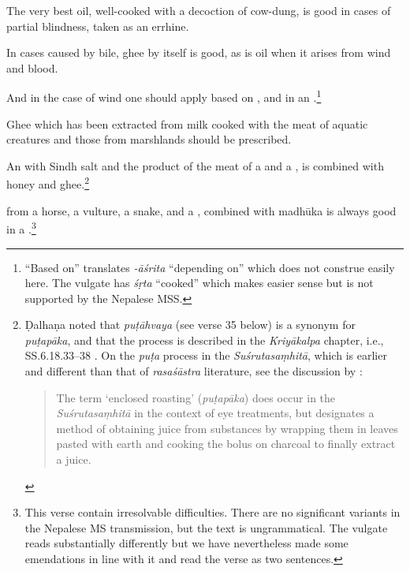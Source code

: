 \begin{translation}
    The very best oil, well-cooked with a decoction of cow-dung, is good in cases of 
    partial blindness, taken as an errhine.
    
    In cases caused by bile, ghee by itself is good, as is oil when it arises from wind and 
    blood.
    
    \item[31]
    And in the case of wind one should apply
     based on
    ,
    and 
    in an .\footnote{“Based on” translates \emph{-āśrita} 
    “depending on” which does not construe easily here.  The vulgate has \emph{śṛta} 
    “cooked” which makes easier sense but is not supported by the Nepalese MSS.}
    
    Ghee which has been extracted from milk cooked with the meat of aquatic 
    creatures and those from marshlands should be prescribed.
    
    \item[32]
    
    \dag An  with  Sindh salt and the product of the
    meat of a  and a , is combined with 
    honey
    and ghee.\footnote{Ḍalhaṇa noted \citep[628a]{vulgate} that \emph{puṭāhvaya} 
    (see
    verse 35 below) is a synonym for \emph{puṭapāka}, and that the process is
    described in the \emph{Kriyākalpa} chapter, i.e., SS.6.18.33--38
    \citep[635]{vulgate}.  On the \emph{puṭa} process in the 
    \emph{Suśrutasaṃhitā},
    which is earlier and different than that of \emph{rasaśāstra} literature, see the
    discussion by  \citet[83]{wujad-2019}:
    \begin{quote}
        The term ‘enclosed roasting’ (\emph{puṭapāka}) does occur in
        the \emph{Suśrutasaṃhitā} in the context of eye treatments, but
        designates a method of obtaining juice from substances by
        wrapping them in leaves pasted with earth and cooking
        the bolus on charcoal to finally extract a juice.
    \end{quote}
    } %
    
     from a horse, a vulture, a snake, and a ,
    combined with \gls{madhūka} is always good in a 
    .\dag\footnote{This
    verse contain irresolvable difficulties. There are no significant variants in the
    Nepalese MS transmission, but the text is ungrammatical.   The vulgate reads
    substantially differently but we have nevertheless made some emendations in line
    with it and read the verse as two sentences.}
    

\end{translation}
